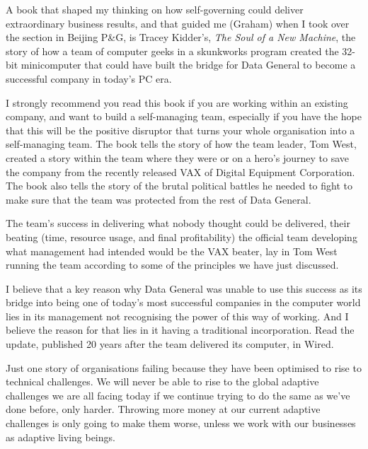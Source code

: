 A book that shaped my thinking on how self-governing could deliver extraordinary business results, and that guided me (Graham) when I took over the section in Beijing P\&G,  is Tracey Kidder's, \emph{The Soul of a New Machine}\cite{kidder-soul},  the story of how a team of computer geeks in a skunkworks program created the 32-bit minicomputer that could have built the bridge for Data General to become a successful company in today's PC era.


I strongly recommend you read this book if you are working within an existing company, and want to build a self-managing team, especially if you have the hope that this will be the positive disruptor that turns your whole organisation into a self-managing team. The book tells the story of how the team leader, Tom West, created a story within the team where they were or on a hero's journey to save the company from the recently released VAX of Digital Equipment Corporation. The book also tells the story of the brutal political battles he needed to fight to make sure that the team was protected from the rest of Data General.  


The team’s success in delivering what nobody thought could be delivered, their beating (time, resource usage, and final profitability) the official team developing what management had intended would be the VAX beater, lay in Tom West running the team according to some of the principles we have just discussed. 


I believe that a key reason why Data General was unable to use this success as its bridge into being one of today's most successful companies in the computer world lies in its management not recognising the power of this way of working. And I believe the reason for that lies in it having a traditional incorporation. Read the update, published 20 years after the team delivered its computer, in Wired\cite{ratliff-wired-soul}.


Just one story of organisations failing because they have been optimised to rise to technical challenges. We will never be able to rise to the global adaptive challenges we are all facing today if we continue trying to do the same as we've done before, only harder. Throwing more money at our current adaptive challenges is only going to make them worse, unless we work with our businesses as adaptive living beings.